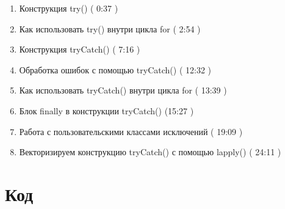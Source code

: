 \documentclass[
]{book}
\providecommand{\tightlist}{%
  \setlength{\itemsep}{0pt}\setlength{\parskip}{0pt}}
\begin{document}
\begin{enumerate}
\def\labelenumi{\arabic{enumi}.}
\tightlist
\item
  Конструкция try() ( 0:37 )
\item
  Как использовать try() внутри цикла for ( 2:54 )
\item
  Конструкция tryCatch() ( 7:16 )
\item
  Обработка ошибок с помощью tryCatch() ( 12:32 )
\item
  Как использовать tryCatch() внутри цикла for ( 13:39 )
\item
  Блок finally в конструкции tryCatch() (15:27 )
\item
  Работа с пользовательскими классами исключений ( 19:09 )
\item
  Векторизируем конструкцию tryCatch() с помощью lapply() ( 24:11 )
\end{enumerate}

\hypertarget{ux43aux43eux434-1}{%
\section{Код}\label{ux43aux43eux434-1}}
\end{document}

